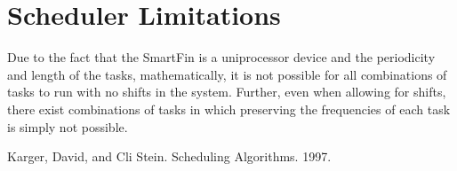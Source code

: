 \documentclass{article}
\begin{document}
\section{Scheduler Limitations}
Due to the fact that the SmartFin is a uniprocessor device and the periodicity and length of the tasks, mathematically, it is not possible for all combinations of tasks to run with no shifts in the system. Further, even when allowing for shifts, there exist combinations of tasks in which preserving the frequencies of each task is simply not possible. 



Karger, David, and Cli Stein. Scheduling Algorithms. 1997.
\end{document}

